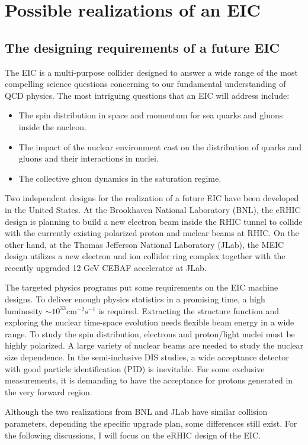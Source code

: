\chapter{Possible realizations of an EIC} 
\label{chp:EIC}

\section{The designing requirements of a future EIC}
The EIC is a multi-purpose collider designed to answer a wide range
of the most compelling science questions concerning to our fundamental understanding of QCD physics. The most intriguing questions
that an EIC will address include:
\begin{itemize}
\item The spin distribution in space and momentum for sea quarks and gluons inside the nucleon.
\item The impact of the nuclear environment cast on the distribution of quarks and gluons and their interactions in nuclei.
\item The collective gluon dynamics in the saturation regime.
\end{itemize}
Two independent designs for the realization of a future EIC have been developed
in the United States. At the Brookhaven National Laboratory (BNL), the eRHIC
design is planning to build a new electron beam inside the RHIC tunnel to
collide with the currently existing polarized proton and nuclear beams at RHIC.
On the other hand, at the Thomas Jefferson National Laboratory (JLab), the MEIC
design utilizes a new electron and ion collider ring complex together with the
recently upgraded 12 GeV CEBAF accelerator at JLab.

The targeted physics programs put some requirements on the EIC machine designs.
To deliver enough physics statistics in a promising time, a high luminosity
$\sim 10^{33} \mathrm{cm}^{-2}\mathrm{s}^{-1}$ is required. Extracting the
structure function and exploring the nuclear time-space evolution needs flexible beam
energy in a wide range. To study the spin distribution, electrons and proton/light
nuclei must be highly polarized. A large variety of nuclear beams are needed to study
the nuclear size dependence. In the semi-inclusive DIS studies, a wide acceptance
detector with good particle identification (PID) is inevitable. For some exclusive
measurements, it is demanding to have the acceptance for protons generated in the
very forward region.

Although the two realizations from BNL and JLab have similar collision parameters,
depending the specific upgrade plan, some differences still exist. For the following
discussions, I will focus on the eRHIC design of the EIC. 


